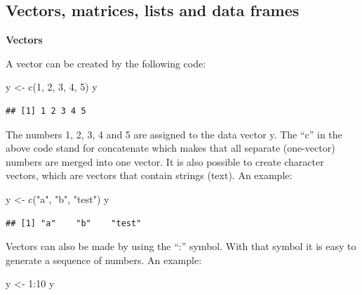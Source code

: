\documentclass[
]{book}
\newenvironment{Shaded}{\begin{snugshade}}{\end{snugshade}}
\newcommand{\DecValTok}[1]{\textcolor[rgb]{0.00,0.00,0.81}{#1}}
\newcommand{\FunctionTok}[1]{\textcolor[rgb]{0.00,0.00,0.00}{#1}}
\newcommand{\NormalTok}[1]{#1}
\newcommand{\OtherTok}[1]{\textcolor[rgb]{0.56,0.35,0.01}{#1}}
\newcommand{\SpecialCharTok}[1]{\textcolor[rgb]{0.00,0.00,0.00}{#1}}
\newcommand{\StringTok}[1]{\textcolor[rgb]{0.31,0.60,0.02}{#1}}
\begin{document}
\hypertarget{vectors-matrices-lists-and-data-frames}{%
\subsection{Vectors, matrices, lists and data frames}\label{vectors-matrices-lists-and-data-frames}}

\textbf{Vectors}

A vector can be created by the following code:

\begin{Shaded}
\begin{Highlighting}[]
\NormalTok{y }\OtherTok{\textless{}{-}} \FunctionTok{c}\NormalTok{(}\DecValTok{1}\NormalTok{, }\DecValTok{2}\NormalTok{, }\DecValTok{3}\NormalTok{, }\DecValTok{4}\NormalTok{, }\DecValTok{5}\NormalTok{)}
\NormalTok{y}
\end{Highlighting}
\end{Shaded}

\begin{verbatim}
## [1] 1 2 3 4 5
\end{verbatim}

The numbers 1, 2, 3, 4 and 5 are assigned to the data vector y. The ``c'' in the above code stand for concatenate which makes that all separate (one-vector) numbers are merged into one vector. It is also possible to create character vectors, which are vectors that contain strings (text). An example:

\begin{Shaded}
\begin{Highlighting}[]
\NormalTok{y }\OtherTok{\textless{}{-}} \FunctionTok{c}\NormalTok{(}\StringTok{"a"}\NormalTok{, }\StringTok{"b"}\NormalTok{, }\StringTok{"test"}\NormalTok{)}
\NormalTok{y}
\end{Highlighting}
\end{Shaded}

\begin{verbatim}
## [1] "a"    "b"    "test"
\end{verbatim}

Vectors can also be made by using the ``:'' symbol. With that symbol it is easy to generate a sequence of numbers. An example:

\begin{Shaded}
\begin{Highlighting}[]
\NormalTok{y }\OtherTok{\textless{}{-}} \DecValTok{1}\SpecialCharTok{:}\DecValTok{10}
\NormalTok{y}
\end{Highlighting}
\end{Shaded}
\end{document}
